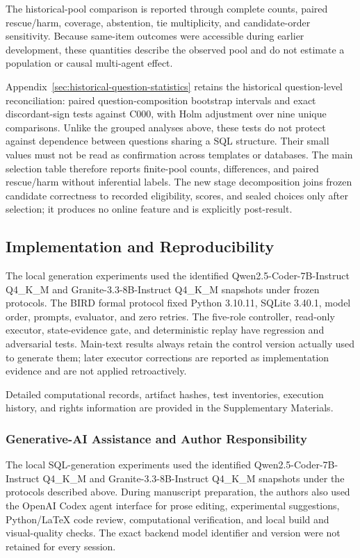 \documentclass[information,article,submit,moreauthors]{Definitions/mdpi}
\begin{document}
The historical-pool comparison is reported through complete counts, paired rescue/harm, coverage, abstention, tie multiplicity, and candidate-order sensitivity. Because same-item outcomes were accessible during earlier development, these quantities describe the observed pool and do not estimate a population or causal multi-agent effect.

Appendix~\ref{sec:historical-question-statistics} retains the historical question-level reconciliation: paired question-composition bootstrap intervals and exact discordant-sign tests against C000, with Holm adjustment over nine unique comparisons. Unlike the grouped analyses above, these tests do not protect against dependence between questions sharing a SQL structure. Their small values must not be read as confirmation across templates or databases. The main selection table therefore reports finite-pool counts, differences, and paired rescue/harm without inferential labels. The new stage decomposition joins frozen candidate correctness to recorded eligibility, scores, and sealed choices only after selection; it produces no online feature and is explicitly post-result.

\subsection{Implementation and Reproducibility}

The local generation experiments used the identified Qwen2.5-Coder-7B-Instruct Q4\_K\_M and Granite-3.3-8B-Instruct Q4\_K\_M snapshots under frozen protocols. The BIRD formal protocol fixed Python 3.10.11, SQLite 3.40.1, model order, prompts, evaluator, and zero retries. The five-role controller, read-only executor, state-evidence gate, and deterministic replay have regression and adversarial tests. Main-text results always retain the control version actually used to generate them; later executor corrections are reported as implementation evidence and are not applied retroactively.

Detailed computational records, artifact hashes, test inventories, execution history, and rights information are provided in the Supplementary Materials.

\subsubsection{Generative-AI Assistance and Author Responsibility}

The local SQL-generation experiments used the identified Qwen2.5-Coder-7B-Instruct Q4\_K\_M and Granite-3.3-8B-Instruct Q4\_K\_M snapshots under the protocols described above. During manuscript preparation, the authors also used the OpenAI Codex agent interface for prose editing, experimental suggestions, Python/\LaTeX{} code review, computational verification, and local build and visual-quality checks. The exact backend model identifier and version were not retained for every session.
\end{document}

